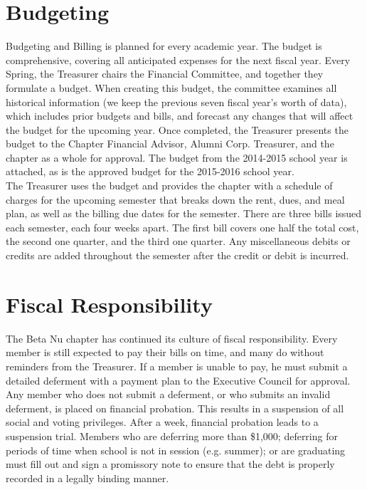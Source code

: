   \section*{Budgeting}
    Budgeting and Billing is planned for every academic year. The budget is comprehensive, covering all anticipated expenses for the next fiscal year. Every Spring, the Treasurer chairs the Financial Committee, and together they formulate a budget. When creating this budget, the committee examines all historical information (we keep the previous seven fiscal year’s worth of data), which includes prior budgets and bills, and forecast any changes that will affect the budget for the upcoming year. Once completed, the Treasurer presents the budget to the Chapter Financial Advisor, Alumni Corp. Treasurer, and the chapter as a whole for approval. The budget from the 2014-2015 school year is attached, as is the approved budget for the 2015-2016 school year. \\

    The Treasurer uses the budget and provides the chapter with a schedule of charges for the upcoming semester that breaks down the rent, dues, and meal plan, as well as the billing due dates for the semester. There are three bills issued each semester, each four weeks apart. The first bill covers one half the total cost, the second one quarter, and the third one quarter. Any miscellaneous debits or credits are added throughout the semester after the credit or debit is incurred.
    
  \section*{Fiscal Responsibility}
  
    The Beta Nu chapter has continued its culture of fiscal responsibility. Every member is still expected to pay their bills on time, and many do without reminders from the Treasurer. If a member is unable to pay, he must submit a detailed deferment with a payment plan to the Executive Council for approval. Any member who does not submit a deferment, or who submits an invalid deferment, is placed on financial probation. This results in a suspension of all social and voting privileges. After a week, financial probation leads to a suspension trial. Members who are deferring more than \$1,000; deferring for periods of time when school is not in session (e.g. summer); or are graduating must fill out and sign a promissory note to ensure that the debt is properly recorded in a legally binding manner. \\

